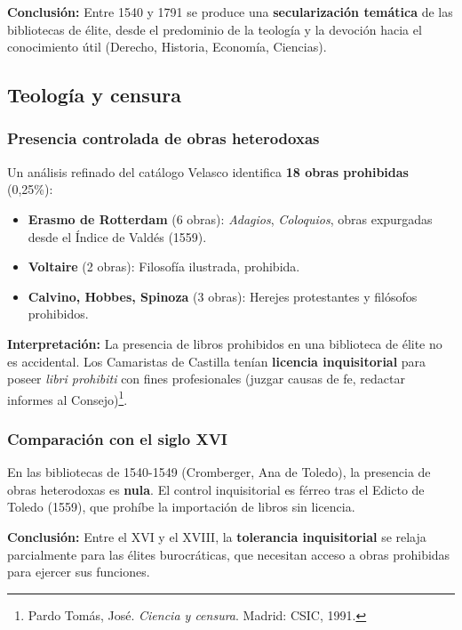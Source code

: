 \documentclass[12pt,a4paper]{article}
\begin{document}
\textbf{Conclusión:} Entre 1540 y 1791 se produce una \textbf{secularización temática} de las bibliotecas de élite, desde el predominio de la teología y la devoción hacia el conocimiento útil (Derecho, Historia, Economía, Ciencias).

\subsection{Teología y censura}

\subsubsection{Presencia controlada de obras heterodoxas}

Un análisis refinado del catálogo Velasco identifica \textbf{18 obras prohibidas} (0,25\%):

\begin{itemize}
\item \textbf{Erasmo de Rotterdam} (6 obras): \textit{Adagios}, \textit{Coloquios}, obras expurgadas desde el Índice de Valdés (1559).
\item \textbf{Voltaire} (2 obras): Filosofía ilustrada, prohibida.
\item \textbf{Calvino, Hobbes, Spinoza} (3 obras): Herejes protestantes y filósofos prohibidos.
\end{itemize}

\textbf{Interpretación:} La presencia de libros prohibidos en una biblioteca de élite no es accidental. Los Camaristas de Castilla tenían \textbf{licencia inquisitorial} para poseer \textit{libri prohibiti} con fines profesionales (juzgar causas de fe, redactar informes al Consejo)\footnote{Pardo Tomás, José. \textit{Ciencia y censura}. Madrid: CSIC, 1991.}.

\subsubsection{Comparación con el siglo XVI}

En las bibliotecas de 1540-1549 (Cromberger, Ana de Toledo), la presencia de obras heterodoxas es \textbf{nula}. El control inquisitorial es férreo tras el Edicto de Toledo (1559), que prohíbe la importación de libros sin licencia.

\textbf{Conclusión:} Entre el XVI y el XVIII, la \textbf{tolerancia inquisitorial} se relaja parcialmente para las élites burocráticas, que necesitan acceso a obras prohibidas para ejercer sus funciones.
\end{document}
